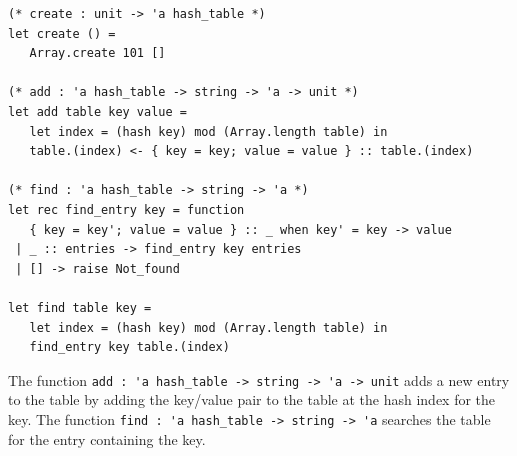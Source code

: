 \begin{ocamlblock}
\begin{ocamlblocksize}
\begin{lstlisting}[name=hash]
(* create : unit -> 'a hash_table *)
let create () =
   Array.create 101 []

(* add : 'a hash_table -> string -> 'a -> unit *)
let add table key value =
   let index = (hash key) mod (Array.length table) in
   table.(index) <- { key = key; value = value } :: table.(index)

(* find : 'a hash_table -> string -> 'a *)
let rec find_entry key = function
   { key = key'; value = value } :: _ when key' = key -> value
 | _ :: entries -> find_entry key entries
 | [] -> raise Not_found

let find table key =
   let index = (hash key) mod (Array.length table) in
   find_entry key table.(index)
\end{lstlisting}
\end{ocamlblocksize}
\end{ocamlblock}
%
The function
\hbox{\lstinline/add : 'a hash_table -> string -> 'a -> unit/} adds a new
entry to the table by adding the key/value pair to the table at the
hash index for the key.  The function
\hbox{\lstinline/find : 'a hash_table -> string -> 'a/}
searches the table for the entry containing the key.
